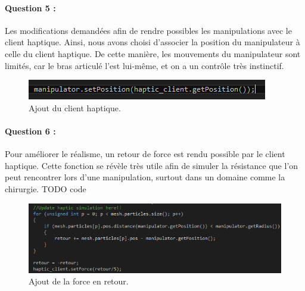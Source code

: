 \documentclass[a4paper,12pt]{article}
\begin{document}
\paragraph{Question 5 :} Les modifications demandées afin de rendre possibles les manipulations avec le client haptique. Ainsi, nous avons choisi d'associer la position du manipulateur à celle du client haptique. De cette manière, les mouvements du manipulateur sont limités, car le bras articulé l'est lui-même, et on a un contrôle très instinctif.
\begin{figure}
  \centering
  \includegraphics{images/ajout_haptique.png}
  \caption{Ajout du client haptique.}
  \label{fig:q5tp2}
\end{figure}

\paragraph{Question 6 :} Pour améliorer le réalisme, un retour de force est rendu possible par le client haptique. Cette fonction se révèle très utile afin de simuler la résistance que l'on peut rencontrer lors d'une manipulation, surtout dans un domaine comme la chirurgie.
TODO code
\begin{figure}
  \centering
  \includegraphics{images/retour_force.png}
  \caption{Ajout de la force en retour.}
  \label{fig:}
\end{figure}
\end{document}
